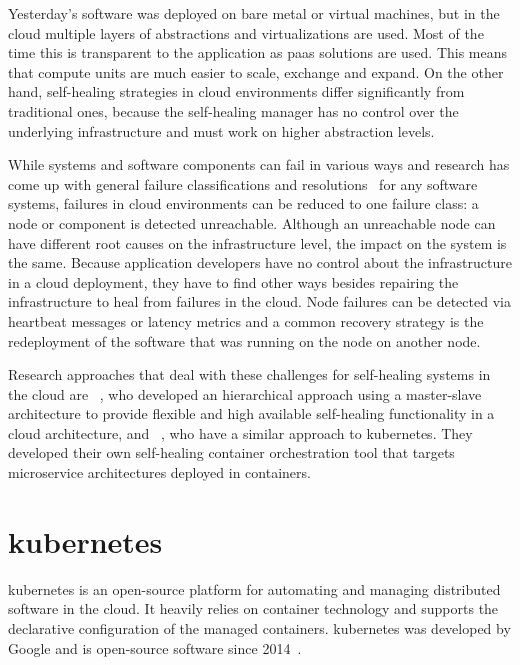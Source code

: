   Yesterday's software was deployed on bare metal or virtual machines, but in the cloud multiple layers of abstractions and virtualizations are used.
  Most of the time this is transparent to the application as \gls{paas} solutions are used.
  This means that compute units are much easier to scale, exchange and expand.
  On the other hand, self-healing strategies in cloud environments differ significantly from traditional ones, because the self-healing manager has no control over the underlying infrastructure and must work on higher abstraction levels.

  While systems and software components can fail in various ways and research has come up with general failure classifications and resolutions~\cite[Tab.~1]{PsaierSurvey} for any software systems, failures in cloud environments can be reduced to one failure class: a node or component is detected unreachable.
  Although an unreachable node can have different root causes on the infrastructure level, the impact on the system is the same.
  Because application developers have no control about the infrastructure in a cloud deployment, they have to find other ways besides repairing the infrastructure to heal from failures in the cloud.
  Node failures can be detected via heartbeat messages or latency metrics and a common recovery strategy is the redeployment of the software that was running on the node on another node.

  Research approaches that deal with these challenges for self-healing systems in the cloud are \citeauthor{StackCloud}~\cite{StackCloud}, who developed an hierarchical approach using a master-slave architecture to provide flexible and high available self-healing functionality in a cloud architecture, and \citeauthor{gru}~\cite{gru}, who have a similar approach to \gls{kubernetes}.
  They developed their own self-healing container orchestration tool that targets microservice architectures deployed in containers.

\section[Kubernetes]{\gls{kubernetes}}\label{sec:kubernetes}
  \Gls{kubernetes} is an open-source platform for automating and managing distributed software in the cloud.
  It heavily relies on container technology and supports the declarative configuration of the managed containers.
  \Gls{kubernetes} was developed by Google and is open-source software since 2014~\cite{kubernetes}.


